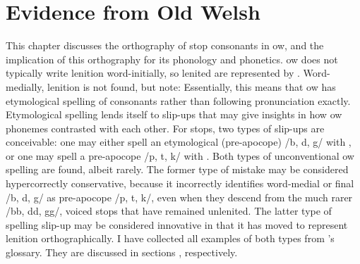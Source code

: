 \chapter{Evidence from Old Welsh}
\label{oldwelsh}
This chapter discusses the orthography of stop consonants in \gls{ow}, and the implication of this orthography for its phonology and phonetics. \Gls{ow} does not typically write lenition word-initially, so lenited  are represented by . Word-medially, lenition is not found, but note: 
Essentially, this means that \gls{ow} has etymological spelling of consonants rather than following pronunciation exactly. Etymological spelling lends itself to slip-ups that may give insights in how \gls{ow} phonemes contrasted with each other. For stops, two types of slip-ups are conceivable: one may either spell an etymological (pre-apocope) /b, d, g/ with , or one may spell a pre-apocope /p, t, k/ with . Both types of unconventional \gls{ow} spelling are found, albeit rarely. The former type of mistake may be considered hypercorrectly conservative, because it incorrectly identifies word-medial or final /b, d, g/ as pre-apocope /p, t, k/, even when they descend from the much rarer /bb, dd, gg/, \ie voiced stops that have remained unlenited. The latter type of spelling slip-up may be considered innovative in that it has moved to represent lenition orthographically. I have collected all examples of both types from \textcite{falileyev_etymological_2000}'s glossary. They are discussed in sections , respectively.





